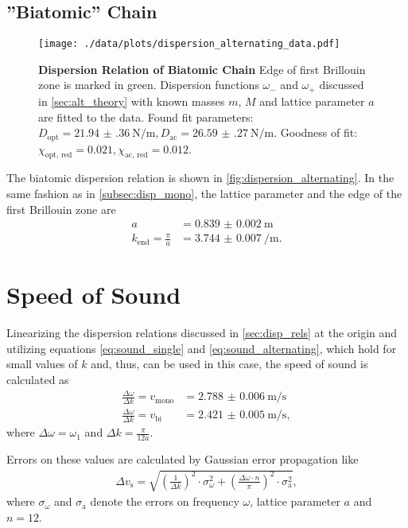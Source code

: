 \subsection{''Biatomic'' Chain}
\begin{figure}
	\centering
	\texttt{[image: ./data/plots/dispersion\_alternating\_data.pdf]}
	\caption[Dispersion Relation of Biatomic Chain]{\textbf{Dispersion Relation of Biatomic Chain} Edge of first Brillouin zone is marked in green.
	Dispersion functions $\omega_{-}$ and $\omega_{+}$ discussed in \autoref{sec:alt_theory} with known masses $m$, $M$ and lattice parameter $a$ are fitted to the data.
	Found fit parameters: $D_\text{opt}=\SI{21.94(36)}{\newton\per\meter}, D_\text{ac}=\SI{26.59(27)}{\newton\per\meter}$. Goodness of fit: $\chi_\text{opt, red}=\num{0.021}, \chi_\text{ac, red}=\num{0.012}$.}
	\label{fig:dispersion_single}
\end{figure}
The biatomic dispersion relation is shown in \autoref{fig:dispersion_alternating}.
In the same fashion as in \autoref{subsec:disp_mono}, the lattice parameter and the edge of the first Brillouin zone are
\begin{align*}
	a &= \SI{0.839(2)}{\meter} \\
	k_\text{end} = \frac{\pi}{a} &= \SI{3.744(7)}{\per\meter}.
\end{align*}

\section{Speed of Sound}
Linearizing the dispersion relations discussed in \autoref{sec:disp_rels} at the origin
and utilizing equations \ref{eq:sound_single} and \ref{eq:sound_alternating}, which hold for small values of $k$ and, thus, can be used in this case,
the speed of sound is calculated as
\begin{align*}
	\frac{\Delta\omega}{\Delta k} = v_\text{mono} &= \SI{2.788(6)}{\meter\per\second} \\
	\frac{\Delta\omega}{\Delta k} = v_\text{bi} &= \SI{2.421(5)}{\meter\per\second},
\end{align*}
where $\Delta\omega = \omega_1$ and $\Delta k = \frac{\pi}{12a}$.

Errors on these values are calculated by Gaussian error propagation like
\begin{align*}
	\Delta v_\text{s} = \sqrt{\left(\frac{1}{\Delta k}\right)^2 \cdot \sigma_\omega^2 + \left(\frac{\Delta\omega\cdot n}{\pi}\right)^2 \cdot \sigma_\text{a}^2},
\end{align*}
where $\sigma_\omega$ and $\sigma_\text{a}$ denote the errors on frequency $\omega$, lattice parameter $a$ and $n=12$.

